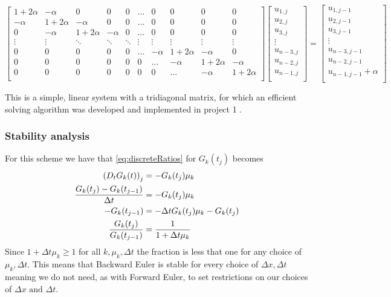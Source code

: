 \documentclass[12pt,english,a4paper]{article}
\begin{document}
\[
    \begin{bmatrix}
        1 + 2\alpha & -\alpha & 0 & 0 & 0 & \dots & 0 & 0 & 0 & 0  \\
        -\alpha & 1+2\alpha & -\alpha & 0 & 0 & \dots & 0 & 0 & 0 & 0  \\
        0 & -\alpha & 1+2\alpha & -\alpha & 0 & \dots & 0 & 0 & 0 & 0 \\
        \vdots & \vdots &  \ddots & \ddots & \ddots & \vdots & \vdots & \vdots & \vdots & \vdots\\
        0 & 0 & 0 & 0 & 0 & \dots & -\alpha & 1+2\alpha & - \alpha & 0\\
        0 & 0 & 0 & 0 & 0 & 0 & \dots & -\alpha & 1+2\alpha & - \alpha\\
        0 & 0 & 0 & 0 & 0 & 0 & 0 & \dots & -\alpha & 1+2\alpha\\
    \end{bmatrix}
    \begin{bmatrix}
        u_{1,j}\\
        u_{2,j}\\
        u_{3,j}\\
        \vdots\\
        u_{n-3,j}\\
        u_{n-2,j}\\
        u_{n-1,j}\\
    \end{bmatrix}
    =
    \begin{bmatrix}
        u_{1,j-1}\\
        u_{2,j-1}\\
        u_{3,j-1}\\
        \vdots\\
        u_{n-3,j-1}\\
        u_{n-2,j-1}\\
        u_{n-1,j-1} + \alpha\\
    \end{bmatrix}
\]

This is a simple, linear system with a tridiagonal matrix, for which an efficient solving algorithm was developed and implemented in project 1 \cite{oblig1}. 

\subsubsection{Stability analysis}
For this scheme we have that \vref{eq:discreteRatios} for \(G_k(t_j)\) becomes
\begin{align*}
\qty(D_tG_k(t))_j &= -G_k(t_j)\mu_k \\
\frac{G_k(t_j) - G_k(t_{j-1}) }{\Delta t} &= -G_k(t_j)\mu_k \\
-G_k(t_{j-1}) &= -\Delta t G_k(t_j)\mu_k - G_k(t_j) \\
\frac{G_k(t_{j}) }{G_k(t_{j-1})} &= \frac{1}{1+\Delta t \mu_k}
\end{align*}
Since \(1+\Delta t \mu_k \geq 1\) for all \(k,\mu_k,\Delta t\) the fraction is less that one for any choice of \(\mu_k,\Delta t\). This means that Backward Euler is stable for every choice of \(\Delta x, \Delta t\) meaning we do not need, as with Forward Euler, to set restrictions on our choices of \(\Delta x \text{ and } \Delta t\).
\end{document}
